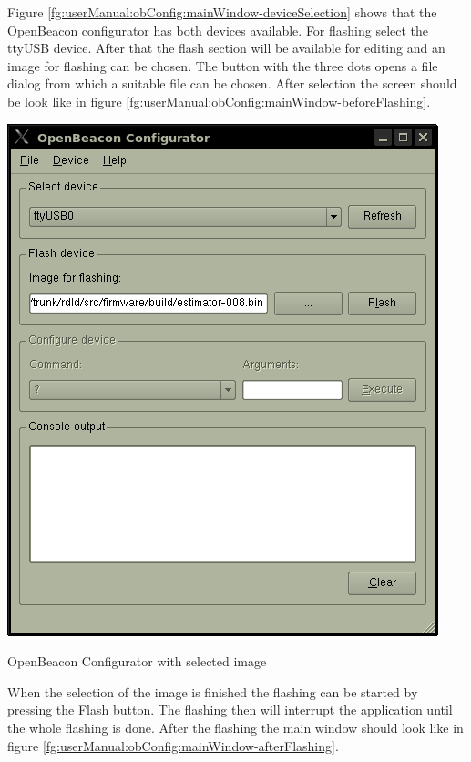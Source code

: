    Figure \ref{fg:userManual:obConfig:mainWindow-deviceSelection} shows that the OpenBeacon configurator has both devices available. For flashing select the ttyUSB device. After that the flash section will be available for editing and an image for flashing can be chosen. The button with the three dots opens a file dialog from which a suitable file can be chosen. After selection the screen should be look like in figure \ref{fg:userManual:obConfig:mainWindow-beforeFlashing}.
   \begin{staticFigure}
    \begin{center}
     \includegraphics{images/UserManual/obConfig/mainWindow-beforeFlashing.png}
     \caption{OpenBeacon Configurator with selected image}
     \label{fg:userManual:obConfig:mainWindow-beforeFlashing}
    \end{center}
   \end{staticFigure}
   When the selection of the image is finished the flashing can be started by pressing the Flash button. The flashing then will interrupt the application until the whole flashing is done. After the flashing the main window should look like in figure \ref{fg:userManual:obConfig:mainWindow-afterFlashing}.
